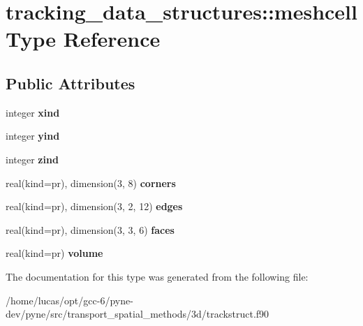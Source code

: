 \hypertarget{structtracking__data__structures_1_1meshcell}{}\section{tracking\+\_\+data\+\_\+structures\+:\+:meshcell Type Reference}
\label{structtracking__data__structures_1_1meshcell}
\subsection*{Public Attributes}
\begin{DoxyCompactItemize}
\item 
integer {\bfseries xind}\hypertarget{structtracking__data__structures_1_1meshcell_afd4a41c0924cdfa672043dff98383247}{}\label{structtracking__data__structures_1_1meshcell_afd4a41c0924cdfa672043dff98383247}

\item 
integer {\bfseries yind}\hypertarget{structtracking__data__structures_1_1meshcell_aaf221593bf60310472dfdcc78d6c2e79}{}\label{structtracking__data__structures_1_1meshcell_aaf221593bf60310472dfdcc78d6c2e79}

\item 
integer {\bfseries zind}\hypertarget{structtracking__data__structures_1_1meshcell_ae19a4af32e3f12bfa8042da05505aa6e}{}\label{structtracking__data__structures_1_1meshcell_ae19a4af32e3f12bfa8042da05505aa6e}

\item 
real(kind=pr), dimension(3, 8) {\bfseries corners}\hypertarget{structtracking__data__structures_1_1meshcell_a13fcf4021ce5a5d1579ffbff38aaf33d}{}\label{structtracking__data__structures_1_1meshcell_a13fcf4021ce5a5d1579ffbff38aaf33d}

\item 
real(kind=pr), dimension(3, 2, 12) {\bfseries edges}\hypertarget{structtracking__data__structures_1_1meshcell_a4edd8593d1bb0badbc5d723780d2c6c5}{}\label{structtracking__data__structures_1_1meshcell_a4edd8593d1bb0badbc5d723780d2c6c5}

\item 
real(kind=pr), dimension(3, 3, 6) {\bfseries faces}\hypertarget{structtracking__data__structures_1_1meshcell_a8b0a596007ab35b13961d9037d7b6e44}{}\label{structtracking__data__structures_1_1meshcell_a8b0a596007ab35b13961d9037d7b6e44}

\item 
real(kind=pr) {\bfseries volume}\hypertarget{structtracking__data__structures_1_1meshcell_a1a08090e934eae80b9b27f55c4ccaa00}{}\label{structtracking__data__structures_1_1meshcell_a1a08090e934eae80b9b27f55c4ccaa00}

\end{DoxyCompactItemize}


The documentation for this type was generated from the following file\+:\begin{DoxyCompactItemize}
\item 
/home/lucas/opt/gcc-\/6/pyne-\/dev/pyne/src/transport\+\_\+spatial\+\_\+methods/3d/trackstruct.\+f90\end{DoxyCompactItemize}
